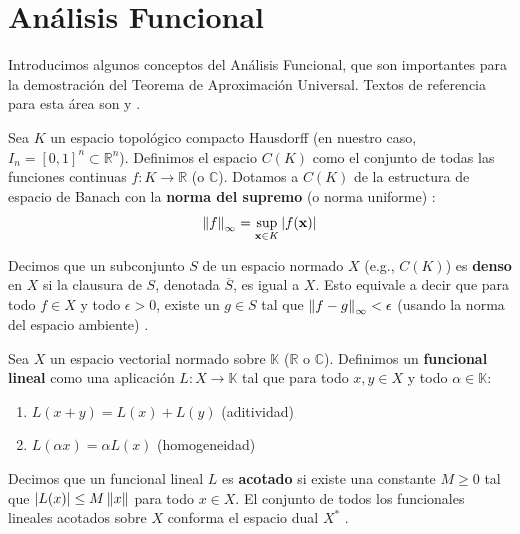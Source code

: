 \section{Análisis Funcional}

Introducimos algunos conceptos del Análisis Funcional, que son importantes para la demostración del Teorema de Aproximación Universal. Textos de referencia para esta área son \citet{Kreyszig1989} y \citet{Rudin1991}.

\begin{definition}
Sea $K$ un espacio topológico compacto Hausdorff (en nuestro caso, $I_n = [0,1]^n \subset \mathbb{R}^n$). Definimos el espacio $C(K)$ como el conjunto de todas las funciones continuas $f: K \to \mathbb{R}$ (o $\mathbb{C}$). Dotamos a $C(K)$ de la estructura de espacio de Banach con la \textbf{norma del supremo} (o norma uniforme) \citep{Kreyszig1989}:
\[ \left\lVert f\right\rVert_{\infty} = \sup_{\mathbf{x} \in K} \left\lvert f(\mathbf{x})\right\rvert \]
\end{definition}

\begin{definition}[Densidad]
Decimos que un subconjunto $S$ de un espacio normado $X$ (e.g., $C(K)$) es \textbf{denso} en $X$ si la clausura de $S$, denotada $\overline{S}$, es igual a $X$. Esto equivale a decir que para todo $f \in X$ y todo $\epsilon > 0$, existe un $g \in S$ tal que $\left\lVert f-g\right\rVert_{\infty} < \epsilon$ (usando la norma del espacio ambiente) \citep{Rudin1991}.
\end{definition}

\begin{definition}
Sea $X$ un espacio vectorial normado sobre $\mathbb{K}$ ($\mathbb{R}$ o $\mathbb{C}$). Definimos un \textbf{funcional lineal} como una aplicación $L: X \to \mathbb{K}$ tal que para todo $x,y \in X$ y todo $\alpha \in \mathbb{K}$:
\begin{enumerate}
    \item $L(x+y) = L(x) + L(y)$ (aditividad)
    \item $L(\alpha x) = \alpha L(x)$ (homogeneidad)
\end{enumerate}
Decimos que un funcional lineal $L$ es \textbf{acotado} si existe una constante $M \ge 0$ tal que $\left\lvert L(x)\right\rvert \le M \left\lVert x\right\rVert$ para todo $x \in X$. El conjunto de todos los funcionales lineales acotados sobre $X$ conforma el espacio dual $X^*$ \citep{Kreyszig1989}.
\end{definition}

